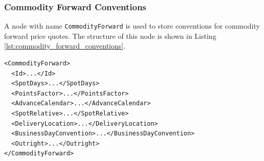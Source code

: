 \subsubsection{Commodity Forward Conventions}
A node with name \lstinline!CommodityForward! is used to store conventions for commodity forward price quotes. The
structure of this node is shown in Listing \ref{lst:commodity_forward_conventions}.

\begin{listing}[H]
\begin{verbatim}
<CommodityForward>
  <Id>...</Id>
  <SpotDays>...</SpotDays>
  <PointsFactor>...</PointsFactor>
  <AdvanceCalendar>...</AdvanceCalendar>
  <SpotRelative>...</SpotRelative>
  <DeliveryLocation>...</DeliveryLocation>
  <BusinessDayConvention>...</BusinessDayConvention>
  <Outright>...</Outright>
</CommodityForward>
\end{verbatim}
\caption{Commodity forward conventions}
\label{lst:commodity_forward_conventions}
\end{listing}

